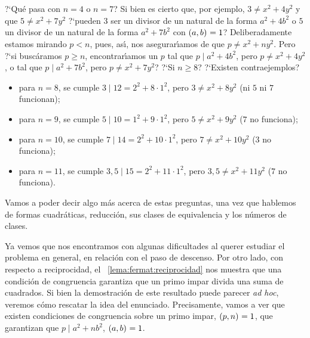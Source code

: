 ?`Qu\'e pasa con $n=4$ o $n=7$? Si bien es cierto que, por ejemplo,
$3\neq x^2+4y^2$ y que $5\neq x^2+7y^2$ ?`pueden $3$ ser un divisor de un
natural de la forma $a^2+4b^2$ o $5$ un divisor de un natural de la forma
$a^2+7b^2$ con $\left({a,b}\right)_{}=1$? Deliberadamente estamos mirando $p<n$, pues,
as\'{\i}, nos asegurar\'{\i}amos de que $p\neq x^2+ny^2$. Pero ?`si
busc\'aramos $p\geq n$, encontrar\'{\i}amos un $p$ tal que
$p\mid a^2+4b^2$, pero $p\neq x^2+4y^2$, o tal que $p\mid a^2+7b^2$, pero
$p\neq x^2+7y^2$? ?`Si $n\geq 8$? ?`Existen contraejemplos?
\begin{itemize}
	\item para $n=8$, se cumple $3\mid 12=2^2+8\cdot 1^2$,
		pero $3\neq x^2+8y^2$
		(ni $5$ ni $7$ funcionan);
	\item para $n=9$, se cumple $5\mid 10=1^2+9\cdot 1^2$,
		pero $5\neq x^2+9y^2$
		($7$ no funciona);
	\item para $n=10$, se cumple $7\mid 14=2^2+10\cdot 1^2$,
		pero $7\neq x^2+10y^2$
		($3$ no funciona);
	\item para $n=11$, se cumple $3,5\mid 15=2^2+11\cdot 1^2$,
		pero $3,5\neq x^2+11y^2$
		($7$ no funciona).
\end{itemize}
%
Vamos a poder decir algo m\'as acerca de estas preguntas, una vez que hablemos
de formas cuadr\'aticas, reducci\'on, sus clases de equivalencia y los
n\'umeros de clases.

Ya vemos que nos encontramos con algunas dificultades al querer estudiar el
problema en general, en relaci\'on con el paso de descenso. Por otro lado,
con respecto a reciprocidad, el \lemaname~\ref{lema:fermat:reciprocidad}
nos muestra que una condici\'on de congruencia garantiza que un primo impar
divida una suma de cuadrados. Si bien la demostraci\'on de este resultado
puede parecer \emph{ad hoc}, veremos c\'omo rescatar la idea del enunciado.
Precisamente, vamos a ver que existen condiciones de congruencia sobre un
primo impar, $\left({p,n}\right)_{}=1$, que garantizan que $p\mid a^2+nb^2$, $\left({a,b}\right)_{}=1$.


